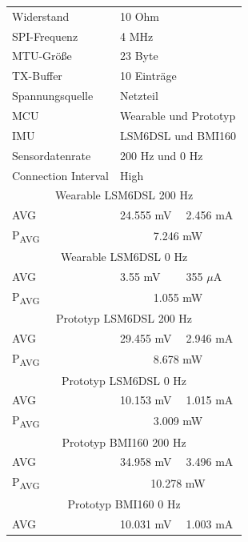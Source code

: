 \begin{figure}[!hbtp]
  \begin{minipage}{0.5\textwidth}
    \centering
    \begin{tabular}{|l|l|l|}
      \hline
      Widerstand & \multicolumn{2}{l|}{10 Ohm}\\
      SPI-Frequenz & \multicolumn{2}{l|}{4 MHz}\\
      MTU-Größe & \multicolumn{2}{l|}{23 Byte}\\
      TX-Buffer & \multicolumn{2}{l|}{10 Einträge}\\
      Spannungsquelle & \multicolumn{2}{l|}{Netzteil}\\
      MCU & \multicolumn{2}{l|}{Wearable und Prototyp}\\
      IMU & \multicolumn{2}{l|}{LSM6DSL und BMI160}\\
      Sensordatenrate & \multicolumn{2}{l|}{200 Hz und 0 Hz}\\
      Connection Interval & \multicolumn{2}{l|}{High}\\
      \hline
      \multicolumn{3}{|c|}{Wearable LSM6DSL 200 Hz}\\
      AVG & 24.555 mV & 2.456 mA\\
      P\textsubscript{AVG} & \multicolumn{2}{c|}{7.246 mW}\\
      \hline
      \multicolumn{3}{|c|}{Wearable LSM6DSL 0 Hz}\\
      AVG & 3.55 mV & 355 $\mu$A\\
      P\textsubscript{AVG} & \multicolumn{2}{c|}{1.055 mW}\\
      \hline
      \multicolumn{3}{|c|}{Prototyp LSM6DSL 200 Hz}\\
      AVG & 29.455 mV & 2.946 mA\\
      P\textsubscript{AVG} & \multicolumn{2}{c|}{8.678 mW}\\
      \hline
      \multicolumn{3}{|c|}{Prototyp LSM6DSL 0 Hz}\\
      AVG & 10.153 mV & 1.015 mA\\
      P\textsubscript{AVG} & \multicolumn{2}{c|}{3.009 mW}\\
      \hline
      \multicolumn{3}{|c|}{Prototyp BMI160 200 Hz}\\
      AVG & 34.958 mV & 3.496 mA\\
      P\textsubscript{AVG} & \multicolumn{2}{c|}{10.278 mW}\\
      \hline
      \multicolumn{3}{|c|}{Prototyp BMI160 0 Hz}\\
      AVG & 10.031 mV & 1.003 mA\\

\end{tabular}
\end{minipage}
\end{figure}
